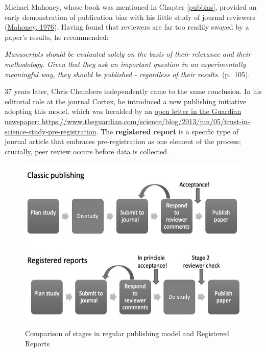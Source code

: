 \documentclass{krantz}
\begin{document}
Michael Mahoney, whose book was mentioned in Chapter \ref{pubbias}, provided an early demonstration of publication bias with his little study of journal reviewers (\protect\hyperlink{ref-mahoney1976}{Mahoney, 1976}). Having found that reviewers are far too readily swayed by a paper's results, he recommended:

\emph{Manuscripts should be evaluated solely on the basis of their relevance and their methodology. Given that they ask an important question in an experimentally meaningful way, they should be published - regardless of their results.} (p.~105).

37 years later, Chris Chambers independently came to the same conclusion. In his editorial role at the journal Cortex, he introduced a new publishing initiative adopting this model, which was heralded by an \href{https://www.theguardian.com/science/blog/2013/jun/05/trust-in-science-study-pre-registration}{open letter in the Guardian newspaper: https://www.theguardian.com/science/blog/2013/jun/05/trust-in-science-study-pre-registration}. The \textbf{registered report} is a specific type of journal article that embraces pre-registration as one element of the process; crucially, peer review occurs before data is collected.

\begin{figure}

{\centering \includegraphics[width=0.75\linewidth]{images_bw/RR_compare_regularpublishing} 

}

\caption{Comparison of stages in regular publishing model and Registered Reports}\label{fig:RRcompare}
\end{figure}
\end{document}
